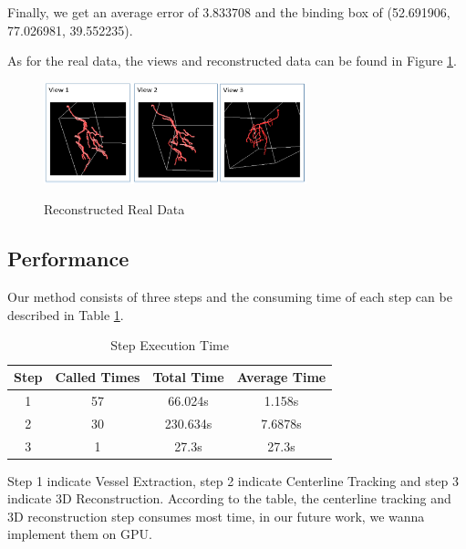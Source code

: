 Finally, we get an average error of 3.833708 and the binding box of
(52.691906, 77.026981, 39.552235).

As for the real data, the views and reconstructed data can be found in
Figure \ref{fig:real_reconstructed_data}.

\begin{figure}
  \centering
  \includegraphics[width=3.0in]{real_data_final.png}\\
  \caption{Reconstructed Real Data}\label{fig:real_reconstructed_data}
\end{figure}

\subsection{Performance}
Our method consists of three steps and the consuming time of each step can
be described in Table \ref{tbl:performance}.

\begin{table}
\begin{tabular}{|c|c|c|c|}
\hline
Step &Called Times&Total Time&Average Time\\
\hline
1 & 57 & 66.024s & 1.158s \\
\hline
2 & 30 & 230.634s & 7.6878s \\
\hline
3 & 1 &27.3s & 27.3s \\
\hline
\end{tabular}
\caption{Step Execution Time}\label {tbl:performance}
\end{table}
Step 1 indicate Vessel Extraction, step 2 indicate Centerline Tracking and
step 3 indicate 3D Reconstruction. According to the table, the centerline
tracking and 3D reconstruction step consumes most time, in our future work,
we wanna implement them on GPU.
